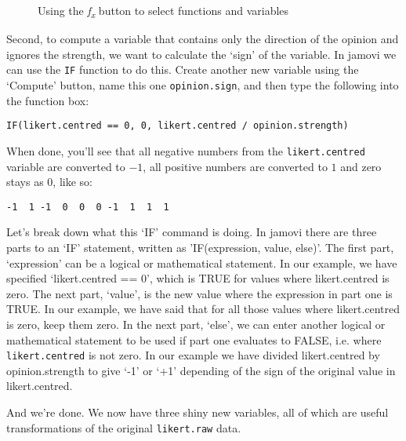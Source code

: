 \bigskip
\begin{figure}[!htb]
\begin{center}
\caption{Using the {\it f\textsubscript{x}} button to select functions and variables}
\label{fig:opinionstrength}
\end{center}
\end{figure}
\bigskip

\noindent
Second, to compute a variable that contains only the direction of the opinion and ignores the strength, we want to calculate the `sign' of the variable. In jamovi we can use the \texttt{IF} function to do this. Create another new variable using the `Compute' button, name this one \texttt{opinion.sign}, and then type the following into the function box: 

\texttt{IF(likert.centred == 0, 0, likert.centred / opinion.strength)} 

When done, you'll see that all negative numbers from the \texttt{likert.centred} variable are converted to $-1$, all positive numbers are converted to $1$ and zero stays as $0$, like so: 

\begin{verbatim}
-1  1 -1  0  0  0 -1  1  1  1
\end{verbatim}

Let's break down what this `IF' command is doing. In jamovi there are three parts to an `IF' statement, written as 'IF(expression, value, else)'. The first part, `expression' can be a logical or mathematical statement. In our example, we have specified `likert.centred == 0', which is TRUE for values where likert.centred is zero. The next part, `value', is the new value where the expression in part one is TRUE. In our example, we have said that for all those values where likert.centred is zero, keep them zero. In the next part, `else', we can enter another logical or mathematical statement to be used if part one evaluates to FALSE, i.e. where \texttt{likert.centred} is not zero. In our example we have divided likert.centred by opinion.strength to give `-1' or `+1' depending of the sign of the original value in likert.centred.

And we're done. We now have three shiny new variables, all of which are useful transformations of the original \texttt{likert.raw} data. 

